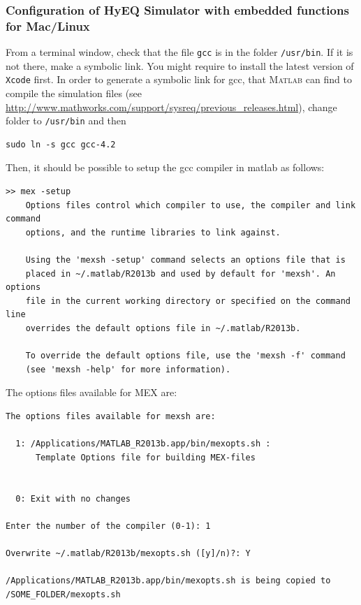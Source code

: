 \documentclass{article}
\newcommand{\matlab}{\textsc{Matlab}}
\begin{document}
\subsubsection{Configuration of HyEQ Simulator with embedded functions for Mac/Linux}

From a terminal window, check that the file {\tt gcc} is in
the folder {\tt/usr/bin}.
If it is not there, make a symbolic link. 
You might require to install the latest version of {\tt Xcode} first.
In order to generate a symbolic link for gcc, that \matlab{} can find to compile the simulation files (see \url{http://www.mathworks.com/support/sysreq/previous_releases.html}), change folder to {\tt /usr/bin} and then
\begin{verbatim}
sudo ln -s gcc gcc-4.2
\end{verbatim}
\noindent Then, it should be possible to setup the gcc compiler in matlab as follows:

\begin{verbatim}
>> mex -setup
    Options files control which compiler to use, the compiler and link command
    options, and the runtime libraries to link against.

    Using the 'mexsh -setup' command selects an options file that is
    placed in ~/.matlab/R2013b and used by default for 'mexsh'. An options 
    file in the current working directory or specified on the command line 
    overrides the default options file in ~/.matlab/R2013b.
 
    To override the default options file, use the 'mexsh -f' command
    (see 'mexsh -help' for more information).

\end{verbatim}

The options files available for MEX are:

\begin{verbatim}
The options files available for mexsh are:

  1: /Applications/MATLAB_R2013b.app/bin/mexopts.sh : 
      Template Options file for building MEX-files
 

  0: Exit with no changes

Enter the number of the compiler (0-1): 1

Overwrite ~/.matlab/R2013b/mexopts.sh ([y]/n)?: Y

/Applications/MATLAB_R2013b.app/bin/mexopts.sh is being copied to 
/SOME_FOLDER/mexopts.sh

\end{verbatim}
\end{document}
